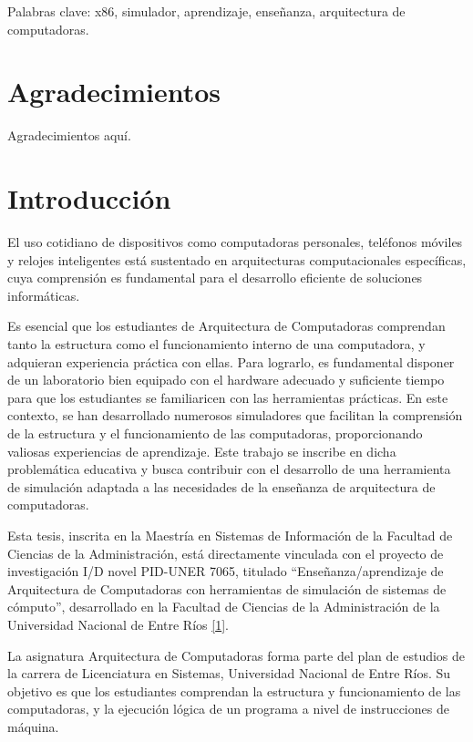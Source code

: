 \documentclass[12pt,oneside]{templates/unerthesis}
\begin{document}
Palabras clave: x86, simulador, aprendizaje, enseñanza, arquitectura de computadoras.

\hypertarget{agradecimientos}{%
\chapter*{Agradecimientos}\label{agradecimientos}}

Agradecimientos aquí.

\hypertarget{intro}{%
\chapter{Introducción}\label{intro}}

El uso cotidiano de dispositivos como computadoras personales, teléfonos móviles y relojes inteligentes está sustentado en arquitecturas computacionales específicas, cuya comprensión es fundamental para el desarrollo eficiente de soluciones informáticas.

Es esencial que los estudiantes de Arquitectura de Computadoras comprendan tanto la estructura como el funcionamiento interno de una computadora, y adquieran experiencia práctica con ellas. Para lograrlo, es fundamental disponer de un laboratorio bien equipado con el hardware adecuado y suficiente tiempo para que los estudiantes se familiaricen con las herramientas prácticas. En este contexto, se han desarrollado numerosos simuladores que facilitan la comprensión de la estructura y el funcionamiento de las computadoras, proporcionando valiosas experiencias de aprendizaje. Este trabajo se inscribe en dicha problemática educativa y busca contribuir con el desarrollo de una herramienta de simulación adaptada a las necesidades de la enseñanza de arquitectura de computadoras.

Esta tesis, inscrita en la Maestría en Sistemas de Información de la Facultad de Ciencias de la Administración, está directamente vinculada con el proyecto de investigación I/D novel PID-UNER 7065, titulado ``Enseñanza/aprendizaje de Arquitectura de Computadoras con herramientas de simulación de sistemas de cómputo'', desarrollado en la Facultad de Ciencias de la Administración de la Universidad Nacional de Entre Ríos \protect\hyperlink{ref-colombani_pid_2022}{{[}1{]}}.

La asignatura Arquitectura de Computadoras forma parte del plan de estudios de la carrera de Licenciatura en Sistemas, Universidad Nacional de Entre Ríos. Su objetivo es que los estudiantes comprendan la estructura y funcionamiento de las computadoras, y la ejecución lógica de un programa a nivel de instrucciones de máquina.
\end{document}

